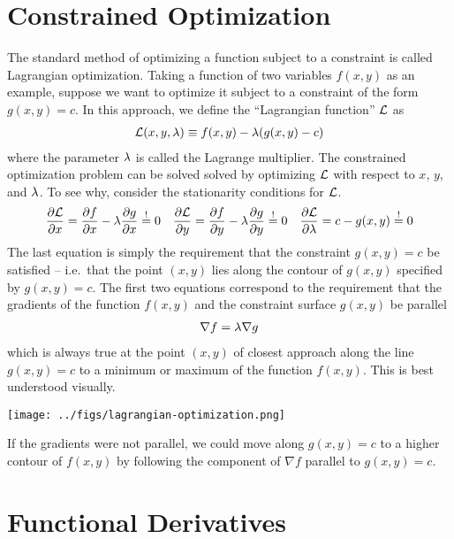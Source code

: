 \documentclass[11pt]{article}
\numberwithin{equation}{section}
\begin{document}
\newpage
\appendix
\section{Constrained Optimization}\label{app:constrained-optimization}
The standard method of optimizing a function subject to a constraint is called Lagrangian optimization.
Taking a function of two variables $f(x,y)$ as an example, suppose we want to optimize it subject to a constraint of the form $g(x,y)=c$.
In this approach, we define the ``Lagrangian function'' $\mathcal{L}$ as
\begin{align}
  \mathcal{L}(x,y,\lambda )
\equiv
  f(x,y)
-
  \lambda (g(x,y)-c)
\end{align}
where the parameter $\lambda $ is called the Lagrange multiplier.
The constrained optimization problem can be solved solved by optimizing $\mathcal{L}$ with respect to $x$, $y$, and $\lambda $.
To see why, consider the stationarity conditions for $\mathcal{L}$.
\begin{align}
  \frac {\partial\mathcal{L}}{\partial x}
=
  \frac {\partial f}{\partial x}
-
  \lambda \frac {\partial g}{\partial x}
\overset{!}=0
&&
  \frac {\partial\mathcal{L}}{\partial y}
=
  \frac {\partial f}{\partial y}
-
  \lambda \frac {\partial g}{\partial y}
\overset{!}=0
&&
  \frac {\partial\mathcal{L}}{\partial\lambda }
=
  c
-
  g(x,y)
\overset{!}=0
\end{align}
The last equation is simply the requirement that the constraint $g(x,y)=c$ be satisfied -- i.e.\ that the point $(x,y)$ lies along the contour of $g(x,y)$ specified by $g(x,y)=c$.
The first two equations correspond to the requirement that the gradients of the function $f(x,y)$ and the constraint surface $g(x,y)$ be parallel
\begin{align}
  \nabla f
=
  \lambda \nabla g
\end{align}
which is always true at the point $(x,y)$ of closest approach along the line $g(x,y)=c$ to a minimum or maximum of the function $f(x,y)$.
This is best understood visually.
\begin{center}
  \texttt{[image: ../figs/lagrangian-optimization.png]}
\end{center}
If the gradients were not parallel, we could move along $g(x,y)=c$ to a higher contour of $f(x,y)$ by following the component of $\nabla f$ parallel to $g(x,y)=c$.


\newpage
\section{Functional Derivatives}\label{app:functional-derivatives}
\end{document}
